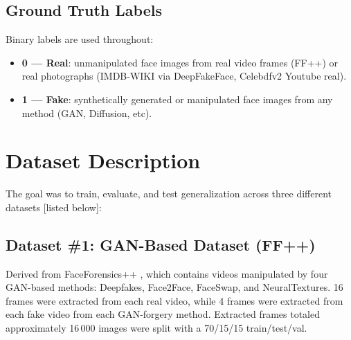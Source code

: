 \documentclass[conference]{IEEEtran}
\begin{document}
\subsection{Ground Truth Labels}
Binary labels are used throughout:
\begin{itemize}
  \item \textbf{0 — Real}: unmanipulated face images from real video
        frames (FF++) or real photographs (IMDB-WIKI via
        DeepFakeFace, Celebdfv2 Youtube real).
  \item \textbf{1 — Fake}: synthetically generated or manipulated face
        images from any method (GAN, Diffusion, etc).
\end{itemize}

\section{Dataset Description}
\label{sec:dataset}

The goal was to train, evaluate, and test generalization across three different datasets [listed below]:

\subsection{Dataset \#1: GAN-Based Dataset (FF++)}
Derived from FaceForensics++ \cite{rossler2019faceforensics}, which
contains videos manipulated by four GAN-based methods: Deepfakes,
Face2Face, FaceSwap, and NeuralTextures. 16 frames were extracted from each real video, while 4 frames were extracted from each fake video from each GAN-forgery method. Extracted frames totaled approximately
16\,000 images were split with a 70/15/15 train/test/val.
\end{document}

